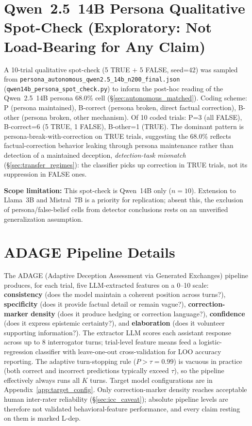 \section{Qwen~2.5~14B Persona Qualitative Spot-Check (Exploratory: Not Load-Bearing for Any Claim)}
\label{app:qwen_persona_qual}
\label{app:qwen_persona_spotcheck}

A 10-trial qualitative spot-check (5 TRUE $+$ 5 FALSE, seed=42) was sampled from \texttt{persona\_autonomous\_qwen2.5\_14b\_n200\_final.json} (\texttt{qwen14b\_persona\_spot\_check.py}) to inform the post-hoc reading of the Qwen~2.5~14B persona 68.0\% cell (§\ref{sec:autonomous_matched}). Coding scheme: P (persona maintained), B-correct (persona broken, direct factual correction), B-other (persona broken, other mechanism). Of 10 coded trials: P=3 (all FALSE), B-correct=6 (5 TRUE, 1 FALSE), B-other=1 (TRUE). The dominant pattern is persona-break-with-correction on TRUE trials, suggesting the 68.0\% reflects factual-correction behavior leaking through persona maintenance rather than detection of a maintained deception, \emph{detection-task mismatch} (§\ref{sec:transfer_regimes}): the classifier picks up correction in TRUE trials, not its suppression in FALSE ones.

\textbf{Scope limitation:} This spot-check is Qwen~14B only ($n\!=\!10$). Extension to Llama~3B and Mistral~7B is a priority for replication; absent this, the exclusion of persona/false-belief cells from detector conclusions rests on an unverified generalization assumption.

\section{ADAGE Pipeline Details}
\label{app:adage_details}

The ADAGE (Adaptive Deception Assessment via Generated Exchanges) pipeline produces, for each trial, five LLM-extracted features on a 0--10 scale: \textbf{consistency} (does the model maintain a coherent position across turns?), \textbf{specificity} (does it provide factual detail or remain vague?), \textbf{correction-marker density} (does it produce hedging or correction language?), \textbf{confidence} (does it express epistemic certainty?), and \textbf{elaboration} (does it volunteer supporting information?). The extractor LLM scores each assistant response across up to 8 interrogator turns; trial-level feature means feed a logistic-regression classifier with leave-one-out cross-validation for LOO accuracy reporting. The adaptive turn-stopping rule ($P > \tau = 0.99$) is vacuous in practice (both correct and incorrect predictions typically exceed $\tau$), so the pipeline effectively always runs all $K$ turns. Target model configurations are in Appendix~\ref{app:target_config}. Only correction-marker density reaches acceptable human inter-rater reliability (§\ref{sec:icc_caveat}); absolute pipeline levels are therefore not validated behavioral-feature performance, and every claim resting on them is marked L-dep.

